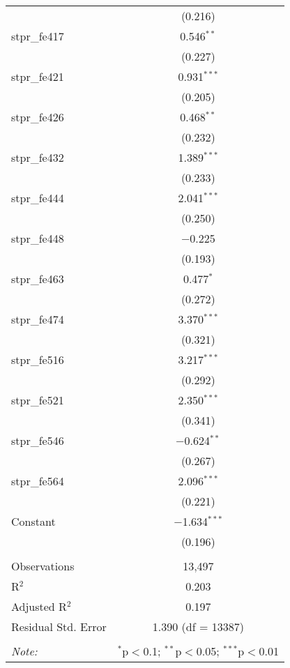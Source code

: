 \begin{table}[!htbp]
\begin{tabular}{@{\extracolsep{5pt}}lc}
  & (0.216) \\ 
  stpr\_fe417 & 0.546$^{**}$ \\ 
  & (0.227) \\ 
  stpr\_fe421 & 0.931$^{***}$ \\ 
  & (0.205) \\ 
  stpr\_fe426 & 0.468$^{**}$ \\ 
  & (0.232) \\ 
  stpr\_fe432 & 1.389$^{***}$ \\ 
  & (0.233) \\ 
  stpr\_fe444 & 2.041$^{***}$ \\ 
  & (0.250) \\ 
  stpr\_fe448 & $-$0.225 \\ 
  & (0.193) \\ 
  stpr\_fe463 & 0.477$^{*}$ \\ 
  & (0.272) \\ 
  stpr\_fe474 & 3.370$^{***}$ \\ 
  & (0.321) \\ 
  stpr\_fe516 & 3.217$^{***}$ \\ 
  & (0.292) \\ 
  stpr\_fe521 & 2.350$^{***}$ \\ 
  & (0.341) \\ 
  stpr\_fe546 & $-$0.624$^{**}$ \\ 
  & (0.267) \\ 
  stpr\_fe564 & 2.096$^{***}$ \\ 
  & (0.221) \\ 
  Constant & $-$1.634$^{***}$ \\ 
  & (0.196) \\ 
 \hline \\[-1.8ex] 
Observations & 13,497 \\ 
R$^{2}$ & 0.203 \\ 
Adjusted R$^{2}$ & 0.197 \\ 
Residual Std. Error & 1.390 (df = 13387) \\ 
\hline 
\hline \\[-1.8ex] 
\textit{Note:}  & \multicolumn{1}{r}{$^{*}$p$<$0.1; $^{**}$p$<$0.05; $^{***}$p$<$0.01} \\ 
\end{tabular} 
\end{table} 
